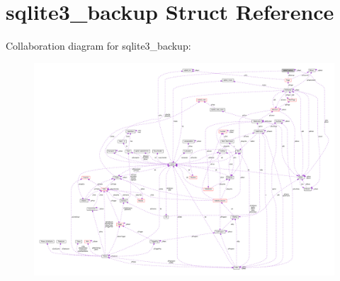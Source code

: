 \hypertarget{structsqlite3__backup}{}\section{sqlite3\+\_\+backup Struct Reference}
\label{structsqlite3__backup}


Collaboration diagram for sqlite3\+\_\+backup\+:\nopagebreak
\begin{figure}[H]
\begin{center}
\leavevmode
\includegraphics[width=350pt]{structsqlite3__backup__coll__graph}
\end{center}
\end{figure}
